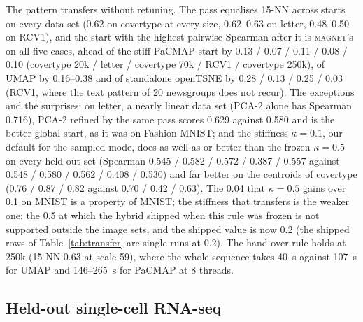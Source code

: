 \documentclass[11pt]{article}
\newcommand{\magnet}{\textsc{magnet}}
\begin{document}
The pattern transfers without retuning. The pass equalises 15-NN across starts on every data set
(0.62 on covertype at every size, 0.62--0.63 on letter, 0.48--0.50 on RCV1), and the start with the
highest pairwise Spearman after it is \magnet{}'s on all five cases, ahead of the stiff PaCMAP start by
0.13 / 0.07 / 0.11 / 0.08 / 0.10 (covertype 20k / letter / covertype 70k / RCV1 / covertype 250k), of
UMAP by 0.16--0.38 and of standalone openTSNE by 0.28 / 0.13 / 0.25 / 0.03 (RCV1, where the text
pattern of 20 newsgroups does not recur). The exceptions and the surprises: on letter, a nearly linear
data set (PCA-2 alone has Spearman 0.716), PCA-2 refined by the same pass scores 0.629 against 0.580 and
is the better global start, as it was on Fashion-MNIST; and the stiffness $\kappa = 0.1$, our default
for the sampled mode, does as well as or better than the frozen $\kappa = 0.5$ on every held-out set
(Spearman 0.545 / 0.582 / 0.572 / 0.387 / 0.557 against 0.548 / 0.580 / 0.562 / 0.408 / 0.530) and far
better on the centroids of covertype (0.76 / 0.87 / 0.82 against 0.70 / 0.42 / 0.63). The 0.04 that
$\kappa = 0.5$ gains over 0.1 on MNIST is a property of MNIST; the stiffness that transfers is the
weaker one: the 0.5 at which the hybrid shipped when this rule was frozen is not supported outside the image
sets, and the shipped value is now 0.2 (the shipped rows of Table~\ref{tab:transfer} are single runs at 0.2). The
hand-over rule holds at 250k (15-NN 0.63 at scale 59), where the whole sequence takes 40~s against
107~s for UMAP and 146--265~s for PaCMAP at 8 threads.

\begin{table}[t]
\centering\small
\caption{Frozen-rule transfer to held-out data (\texttt{k27\_transfer.py}, 8 threads, shared machine;
nothing tuned on these data). Each start goes through the same pass; Spearman before the pass, then
15-NN, Spearman and centroid Spearman after it (means over runs, $\pm$ standard deviation when more
than one); references without a start. RCV1 has no labels in this protocol.}
\label{tab:transfer}
\resizebox{\textwidth}{!}{}
\end{table}

\subsection{Held-out single-cell RNA-seq}\label{sec:scrna}
\end{document}

